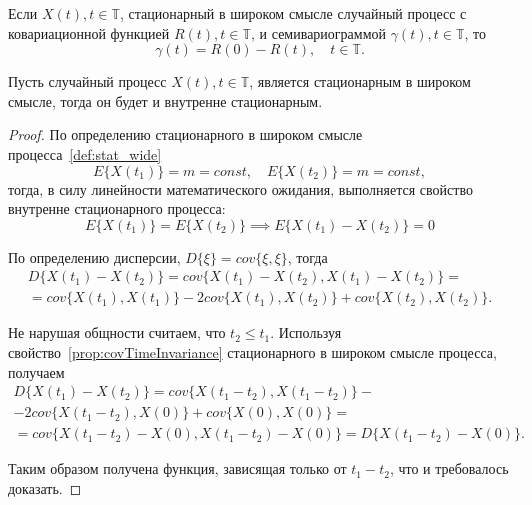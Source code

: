 \begin{Remark}
	Если $ X(t), t \in \mathbb{T} $, стационарный в широком смысле случайный процесс с ковариационной функцией $ R(t), t \in \mathbb{T} $, и семивариограммой $ \gamma(t), t \in \mathbb{T} $, то
	\begin{equation*}
		\gamma(t) = R(0) - R(t), \quad t \in \mathbb{T}.
	\end{equation*}
\end{Remark}

\begin{Theorem}
	Пусть случайный процесс $ X(t), t \in \mathbb{T} $, является стационарным в широком смысле, тогда он будет и внутренне стационарным.
\end{Theorem}
\begin{proof}

По определению стационарного в широком смысле процесса~\eqref{def:stat_wide}
\begin{equation*}
	E \{ X(t_1) \} = m = const, \quad E \{ X(t_2) \} = m = const,
\end{equation*}
тогда, в силу линейности математического ожидания, выполняется свойство внутренне стационарного процесса:
\begin{equation*}
	E \{ X(t_1) \} = E \{ X(t_2) \} \implies E \{ X(t_1) - X(t_2) \} = 0
\end{equation*}

По определению дисперсии, $ D\{\xi\} = cov\{\xi, \xi\} $, тогда
\begin{equation*}\begin{gathered}
	D\{X(t_1) - X(t_2)\} = cov\{X(t_1) - X(t_2), X(t_1) - X(t_2)\} = \\
	= cov\{X(t_1), X(t_1)\} - 2cov\{X(t_1), X(t_2)\} + cov\{X(t_2), X(t_2)\}.
\end{gathered}\end{equation*}

Не нарушая общности считаем, что $ t_2 \le t_1 $. Используя свойство~\ref{prop:covTimeInvariance} стационарного в широком смысле процесса, получаем
\begin{equation*}\begin{gathered}
	D\{X(t_1) - X(t_2)\} = cov\{X(t_1 - t_2), X(t_1 - t_2)\} - \\
	- 2cov\{X(t_1 - t_2), X(0)\} + cov\{X(0), X(0)\} = \\
	= cov\{X(t_1 - t_2) - X(0), X(t_1 - t_2) - X(0)\} = D\{X(t_1 - t_2) - X(0)\}.
\end{gathered}\end{equation*}

Таким образом получена функция, зависящая только от $ t_1 - t_2 $, что и требовалось доказать.
\end{proof}

